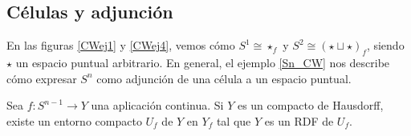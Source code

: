 \newpage
\subsection{Células y adjunción}

\begin{ejem}
En las figuras \ref{CWej1} y \ref{CWej4}, vemos cómo $S^1\cong \star_f$ y $S^2 \cong (\star\sqcup\star)_f$, siendo $\star$ un espacio puntual arbitrario. En general, el ejemplo \ref{Sn_CW} nos describe cómo expresar $S^n$ como adjunción de una célula a un espacio puntual.
\end{ejem}

\begin{lema}\label{EntornoCompacto}
Sea $f: S^{n-1} \longrightarrow Y$ una aplicación continua. Si $Y$ es un compacto de Hausdorff, existe un entorno compacto $U_f$ de $Y$ en $Y_f$ tal que $Y$ es un RDF de $U_f$.
\end{lema}

